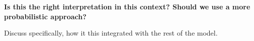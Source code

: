 {\bf Is this the right interpretation in this context? Should we use a
  more probabilistic approach?

Discuss specifically, how it this integrated with the rest of the
model. }


